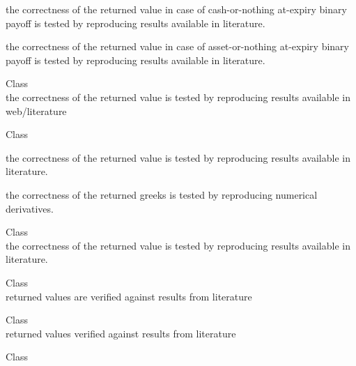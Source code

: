 \begin{DoxyRefList}
\begin{DoxyItemize}
\item the correctness of the returned value in case of cash-\/or-\/nothing at-\/expiry binary payoff is tested by reproducing results available in literature.
\item the correctness of the returned value in case of asset-\/or-\/nothing at-\/expiry binary payoff is tested by reproducing results available in literature. 
\end{DoxyItemize}
\item[Class \doxylink{class_quant_lib_1_1_analytic_b_s_m_hull_white_engine}{Quant\+Lib\+::Analytic\+BSMHull\+White\+Engine} ]\hfill \\
\label{test__test000136}%
%
the correctness of the returned value is tested by reproducing results available in web/literature  
\item[Class \doxylink{class_quant_lib_1_1_analytic_cliquet_engine}{Quant\+Lib\+::Analytic\+Cliquet\+Engine} ]\hfill \\
\label{test__test000117}%
%

\begin{DoxyItemize}
\item the correctness of the returned value is tested by reproducing results available in literature.
\item the correctness of the returned greeks is tested by reproducing numerical derivatives. 
\end{DoxyItemize}
\item[Class \doxylink{class_quant_lib_1_1_analytic_compound_option_engine}{Quant\+Lib\+::Analytic\+Compound\+Option\+Engine} ]\hfill \\
\label{test__test000120}%
%
the correctness of the returned value is tested by reproducing results available in literature.  
\item[Class \doxylink{class_quant_lib_1_1_analytic_continuous_fixed_lookback_engine}{Quant\+Lib\+::Analytic\+Continuous\+Fixed\+Lookback\+Engine} ]\hfill \\
\label{test__test000128}%
%
returned values are verified against results from literature  
\item[Class \doxylink{class_quant_lib_1_1_analytic_continuous_floating_lookback_engine}{Quant\+Lib\+::Analytic\+Continuous\+Floating\+Lookback\+Engine} ]\hfill \\
\label{test__test000129}%
%
returned values verified against results from literature  
\item[Class \doxylink{class_quant_lib_1_1_analytic_continuous_geometric_average_price_asian_engine}{Quant\+Lib\+::Analytic\+Continuous\+Geometric\+Average\+Price\+Asian\+Engine} ]\hfill \\
\label{test__test000093}%
%


\end{DoxyRefList}
